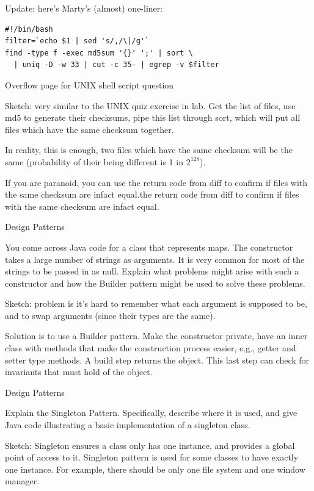 \documentclass[11pt]{exam}
\begin{document}
\begin{questions}
Update: here's Marty's (almost) one-liner:
\begin{verbatim}
#!/bin/bash
filter=`echo $1 | sed 's/,/\|/g'`
find -type f -exec md5sum '{}' ';' | sort \
  | uniq -D -w 33 | cut -c 35- | egrep -v $filter
\end{verbatim}

\newpage Overflow page for UNIX shell script question

Sketch: very similar to the UNIX quiz exercise in lab. Get the list of files, use md5 to generate
their checksums, pipe this list through sort, which will put all files which have the same 
checksum together. 

In reality, this is enough, two files which have the same checksum will be the same (probability of
their being different is 1 in $2^{128}$).

If you are paranoid, you can use the return code from diff to confirm if
files with the same checksum are infact equal.the return code from diff to confirm if
files with the same checksum are infact equal.

\newpage
\question[6] Design Patterns

You come across Java code for a class that represents maps. 
The constructor takes a large number of strings as arguments. 
It is very common for most of the strings to be passed in as null.
Explain what problems might arise with such a constructor and 
how the Builder pattern  might be used to solve these problems.

Sketch: problem is it's hard to remember what each argument is supposed to be,
and to swap arguments (since their types are the same).

Solution is to use a Builder pattern. 
Make the constructor private, have an inner class with methods that make the
construction process easier, e.g., getter and setter type
methods.  A build step returns the object. This last step can check for invariants
that must hold of the object.

\vfill
\question[6] Design Patterns

Explain the Singleton Pattern. Specifically, describe
where it is used, and give Java code illustrating a basic implementation
of a singleton class.
\vfill

Sketch: Singleton ensures a class only has one instance, and provides a global
point of access to it. Singleton pattern is used for some classes to have
exactly one instance. For example, there should be only one file system and one
window manager. 


\end{questions}
\end{document}
